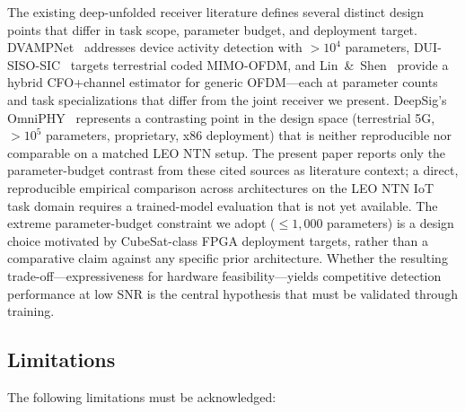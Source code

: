 \documentclass{article}
\begin{document}
The existing deep-unfolded receiver literature defines several distinct design points that differ in task scope, parameter budget, and deployment target. DVAMPNet~\cite{hou2025dvampnet} addresses device activity detection with $>10^4$ parameters, DUI-SISO-SIC~\cite{mazumdar2024dui} targets terrestrial coded MIMO-OFDM, and Lin~\&~Shen~\cite{lin2024hybrid} provide a hybrid CFO+channel estimator for generic OFDM---each at parameter counts and task specializations that differ from the joint receiver we present. DeepSig's OmniPHY~\cite{deepsig2024} represents a contrasting point in the design space (terrestrial 5G, $>10^5$ parameters, proprietary, x86 deployment) that is neither reproducible nor comparable on a matched LEO NTN setup. The present paper reports only the parameter-budget contrast from these cited sources as literature context; a direct, reproducible empirical comparison across architectures on the LEO NTN IoT task domain requires a trained-model evaluation that is not yet available. The extreme parameter-budget constraint we adopt ($\leq 1{,}000$ parameters) is a design choice motivated by CubeSat-class FPGA deployment targets, rather than a comparative claim against any specific prior architecture. Whether the resulting trade-off---expressiveness for hardware feasibility---yields competitive detection performance at low SNR is the central hypothesis that must be validated through training.

\subsection{Limitations}
\label{sec:limitations}

The following limitations must be acknowledged:
\end{document}
